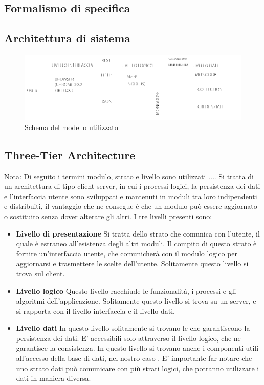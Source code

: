 \subsection{Formalismo di specifica}

\subsection{Architettura di sistema}

\begin{figure}
\centering
\includegraphics[scale=7]{3-TIER.png}
\caption{Schema del modello utilizzato}\label{fig:1}
\end{figure}

\subsection{Three-Tier Architecture}

Nota: Di seguito i termini modulo, strato e livello sono utilizzati .... 
Si tratta di un architettura di tipo client-server, in cui i processi logici, la persistenza dei dati e l'interfaccia utente sono sviluppati e mantenuti in moduli tra loro indipendenti e distribuiti, il vantaggio che ne consegue è che un modulo può essere aggiornato o sostituito senza dover alterare gli altri.
I tre livelli presenti sono:
\begin{itemize}
\item \textbf{Livello di presentazione} Si tratta dello strato che comunica con l'utente, il quale è estraneo all'esistenza degli altri moduli. Il compito di questo strato è fornire un'interfaccia utente, che comunicherà con il modulo logico per aggiornarsi e trasmettere le scelte dell'utente. Solitamente questo livello si trova sul client.
\item \textbf{Livello logico} Questo livello racchiude le funzionalità, i processi e gli algoritmi dell'applicazione. Solitamente questo livello si trova su un server, e si rapporta con il livello interfaccia e il livello dati. 
\item \textbf{Livello dati} In questo livello solitamente si trovano le  che garantiscono la persistenza dei dati. E' accessibili solo attraverso il livello logico, che ne garantisce la consistenza. In questo livello si trovano anche i componenti utili all'accesso della base di dati, nel nostro caso .
E' importante far notare che uno strato dati può comunicare con più strati logici, che potranno utilizzare i dati in maniera diversa.
\end{itemize}



